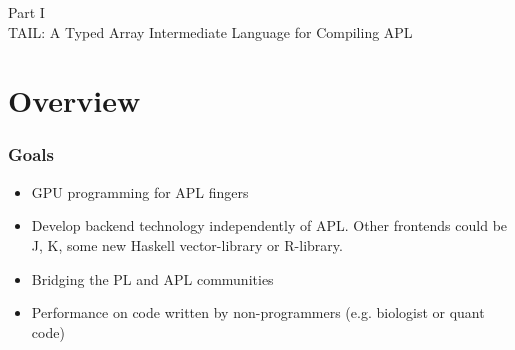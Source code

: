 \documentclass{beamer}
\begin{document}
\begin{frame}[plain,c]
  \begin{center}
    Part I \\
 \huge  TAIL: A Typed Array Intermediate Language for Compiling APL
\end{center}
\end{frame}





\section{Overview}

\begin{frame}
\frametitle{Goals}
\begin{itemize}
\item GPU programming for APL fingers
\item Develop backend technology independently of APL. Other frontends
  could be J, K, some new Haskell vector-library or R-library.
\item Bridging the PL and APL communities
\item Performance on code written by non-programmers (e.g. biologist
  or quant code)
\end{itemize}

\end{frame}
\end{document}
